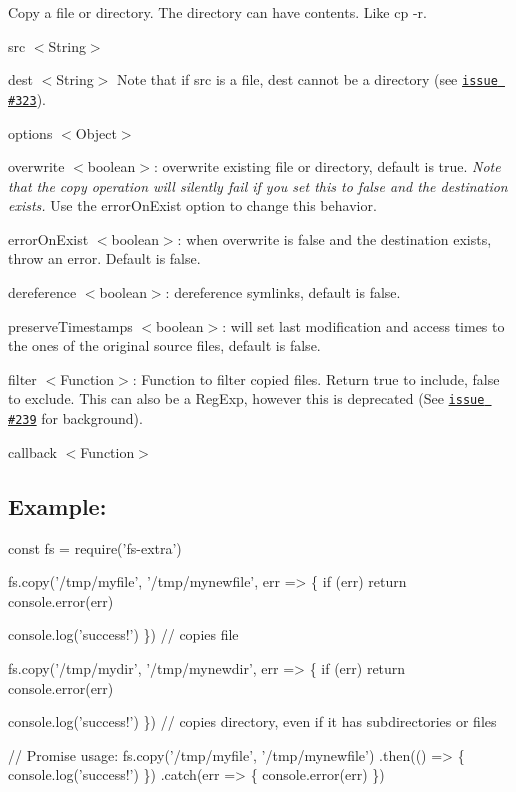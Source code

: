 Copy a file or directory. The directory can have contents. Like {\ttfamily cp -\/r}.


\begin{DoxyItemize}
\item {\ttfamily src} {\ttfamily $<$String$>$}
\item {\ttfamily dest} {\ttfamily $<$String$>$} Note that if {\ttfamily src} is a file, {\ttfamily dest} cannot be a directory (see \href{https://github.com/jprichardson/node-fs-extra/issues/323}{\tt issue \#323}).
\item {\ttfamily options} {\ttfamily $<$Object$>$}
\begin{DoxyItemize}
\item {\ttfamily overwrite} {\ttfamily $<$boolean$>$}\+: overwrite existing file or directory, default is {\ttfamily true}. {\itshape Note that the copy operation will silently fail if you set this to {\ttfamily false} and the destination exists.} Use the {\ttfamily error\+On\+Exist} option to change this behavior.
\item {\ttfamily error\+On\+Exist} {\ttfamily $<$boolean$>$}\+: when {\ttfamily overwrite} is {\ttfamily false} and the destination exists, throw an error. Default is {\ttfamily false}.
\item {\ttfamily dereference} {\ttfamily $<$boolean$>$}\+: dereference symlinks, default is {\ttfamily false}.
\item {\ttfamily preserve\+Timestamps} {\ttfamily $<$boolean$>$}\+: will set last modification and access times to the ones of the original source files, default is {\ttfamily false}.
\item {\ttfamily filter} {\ttfamily $<$Function$>$}\+: Function to filter copied files. Return {\ttfamily true} to include, {\ttfamily false} to exclude. This can also be a Reg\+Exp, however this is deprecated (See \href{https://github.com/jprichardson/node-fs-extra/issues/239}{\tt issue \#239} for background).
\end{DoxyItemize}
\item {\ttfamily callback} {\ttfamily $<$Function$>$}
\end{DoxyItemize}

\subsection*{Example\+:}


\begin{DoxyCode}
const fs = require('fs-extra')

fs.copy('/tmp/myfile', '/tmp/mynewfile', err => \{
  if (err) return console.error(err)

  console.log('success!')
\}) // copies file

fs.copy('/tmp/mydir', '/tmp/mynewdir', err => \{
  if (err) return console.error(err)

  console.log('success!')
\}) // copies directory, even if it has subdirectories or files

// Promise usage:
fs.copy('/tmp/myfile', '/tmp/mynewfile')
.then(() => \{
  console.log('success!')
\})
.catch(err => \{
  console.error(err)
\})
\end{DoxyCode}


